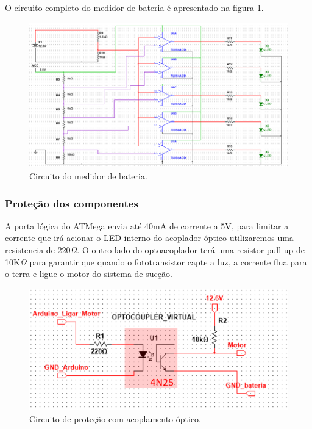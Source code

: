 		O circuito completo do medidor de bateria é apresentado na figura \ref{img:medidor_de_bateria}.

		\begin{figure}[H]
			\centering
			\includegraphics[scale=0.7]{figuras/Med_bateria.png}
			\caption{Circuito do medidor de bateria.}
			\label{img:medidor_de_bateria}
		\end{figure}

		\subsubsection{Proteção dos componentes}
		\label{sub:Proteção_dos_componentes_2}
		A porta lógica do ATMega envia até 40mA de corrente a 5V, para limitar a corrente que irá acionar o LED interno do acoplador óptico utilizaremos uma resistencia de 220$\Omega$. O outro lado do optoacoplador  terá uma resistor pull-up de 10K$\Omega$ para garantir que quando o fototransistor capte a luz, a corrente flua para o terra e ligue o motor do sistema de sucção.

		\begin{figure}[H]
			\centering
			\includegraphics[scale=0.4]{figuras/simulacao_optacoplador.png}
			\caption{Circuito de proteção com acoplamento óptico.}
			\label{img:circuito_de_proteção}
		\end{figure}
	
